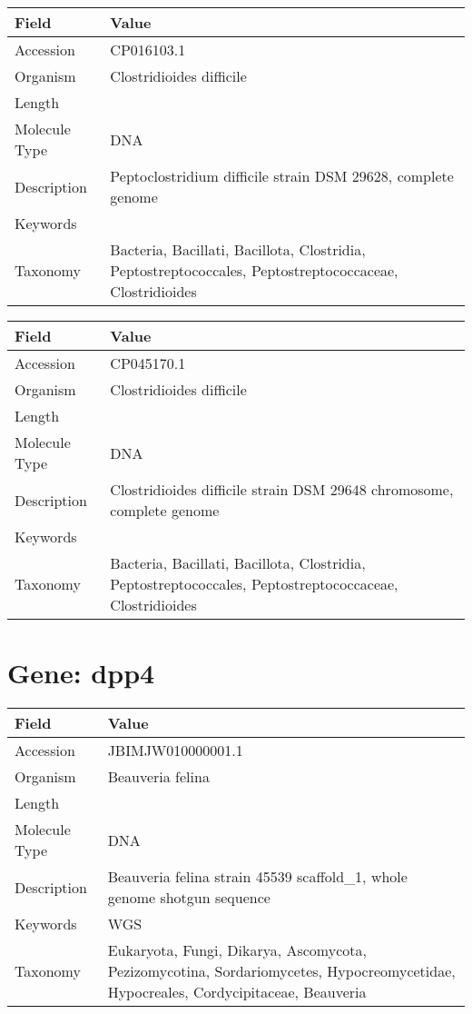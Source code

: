 \documentclass[10pt]{article}
\begin{document}
\vspace{1em}
{\footnotesize
\begin{longtable}{>{\raggedright\arraybackslash}p{4.5cm} >{\raggedright\arraybackslash}p{11.5cm}}
\textbf{Field} & \textbf{Value} \\
\hline
Accession & CP016103.1 \\
Organism & Clostridioides difficile \\
Length & 4253996 \\
Molecule Type & DNA \\
Description & Peptoclostridium difficile strain DSM 29628, complete genome \\
Keywords &  \\
Taxonomy & Bacteria, Bacillati, Bacillota, Clostridia, Peptostreptococcales, Peptostreptococcaceae, Clostridioides \\
\end{longtable}
}

\vspace{1em}
{\footnotesize
\begin{longtable}{>{\raggedright\arraybackslash}p{4.5cm} >{\raggedright\arraybackslash}p{11.5cm}}
\textbf{Field} & \textbf{Value} \\
\hline
Accession & CP045170.1 \\
Organism & Clostridioides difficile \\
Length & 4250841 \\
Molecule Type & DNA \\
Description & Clostridioides difficile strain DSM 29648 chromosome, complete genome \\
Keywords &  \\
Taxonomy & Bacteria, Bacillati, Bacillota, Clostridia, Peptostreptococcales, Peptostreptococcaceae, Clostridioides \\
\end{longtable}
}

\vspace{1em}
\section{Gene: dpp4}
{\footnotesize
\begin{longtable}{>{\raggedright\arraybackslash}p{4.5cm} >{\raggedright\arraybackslash}p{11.5cm}}
\textbf{Field} & \textbf{Value} \\
\hline
Accession & JBIMJW010000001.1 \\
Organism & Beauveria felina \\
Length & 4728797 \\
Molecule Type & DNA \\
Description & Beauveria felina strain 45539 scaffold\_1, whole genome shotgun sequence \\
Keywords & WGS \\
Taxonomy & Eukaryota, Fungi, Dikarya, Ascomycota, Pezizomycotina, Sordariomycetes, Hypocreomycetidae, Hypocreales, Cordycipitaceae, Beauveria \\
\end{longtable}
}
\end{document}
